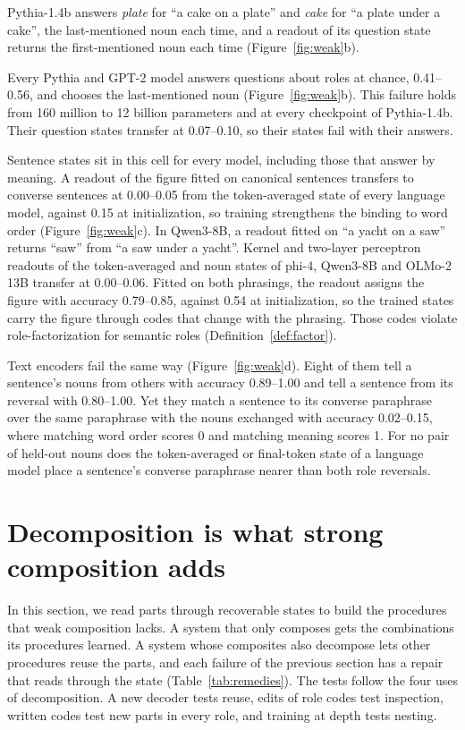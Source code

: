 \documentclass[10pt]{article}
\theoremstyle{plain}
\theoremstyle{remark}
\begin{document}
Pythia-1.4b answers \emph{plate} for ``a cake on a plate'' and \emph{cake} for ``a plate under a cake'', the last-mentioned noun each time, and a readout of its question state returns the first-mentioned noun each time (Figure~\ref{fig:weak}b).

Every Pythia and GPT-2 model answers questions about roles at chance, 0.41--0.56, and chooses the last-mentioned noun (Figure~\ref{fig:weak}b). This failure holds from 160 million to 12 billion parameters and at every checkpoint of Pythia-1.4b. Their question states transfer at 0.07--0.10, so their states fail with their answers.

Sentence states sit in this cell for every model, including those that answer by meaning. A readout of the figure fitted on canonical sentences transfers to converse sentences at 0.00--0.05 from the token-averaged state of every language model, against 0.15 at initialization, so training strengthens the binding to word order (Figure~\ref{fig:weak}c). In Qwen3-8B, a readout fitted on ``a yacht on a saw'' returns ``saw'' from ``a saw under a yacht''. Kernel and two-layer perceptron readouts of the token-averaged and noun states of phi-4, Qwen3-8B and OLMo-2 13B transfer at 0.00--0.06. Fitted on both phrasings, the readout assigns the figure with accuracy 0.79--0.85, against 0.54 at initialization, so the trained states carry the figure through codes that change with the phrasing. Those codes violate role-factorization for semantic roles (Definition~\ref{def:factor}).

Text encoders fail the same way (Figure~\ref{fig:weak}d). Eight of them tell a sentence's nouns from others with accuracy 0.89--1.00 and tell a sentence from its reversal with 0.80--1.00. Yet they match a sentence to its converse paraphrase over the same paraphrase with the nouns exchanged with accuracy 0.02--0.15, where matching word order scores 0 and matching meaning scores 1. For no pair of held-out nouns does the token-averaged or final-token state of a language model place a sentence's converse paraphrase nearer than both role reversals.

\section{Decomposition is what strong composition adds}
\label{sec:success}

In this section, we read parts through recoverable states to build the procedures that weak composition lacks. A system that only composes gets the combinations its procedures learned. A system whose composites also decompose lets other procedures reuse the parts, and each failure of the previous section has a repair that reads through the state (Table~\ref{tab:remedies}). The tests follow the four uses of decomposition. A new decoder tests reuse, edits of role codes test inspection, written codes test new parts in every role, and training at depth tests nesting.
\end{document}
